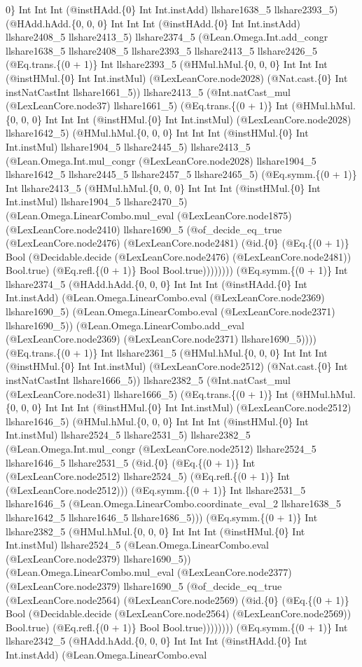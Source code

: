\documentclass[11pt]{article}
\begin{document}
0\} Int Int Int (@instHAdd.\{0\} Int Int.instAdd) llshare1638\_5 llshare2393\_5) (@HAdd.hAdd.\{0, 0, 0\} Int Int Int (@instHAdd.\{0\} Int Int.instAdd) llshare2408\_5 llshare2413\_5) llshare2374\_5 (@Lean.Omega.Int.add\_congr llshare1638\_5 llshare2408\_5 llshare2393\_5 llshare2413\_5 llshare2426\_5 (@Eq.trans.\{(0 + 1)\} Int llshare2393\_5 (@HMul.hMul.\{0, 0, 0\} Int Int Int (@instHMul.\{0\} Int Int.instMul) (@LexLeanCore.node2028) (@Nat.cast.\{0\} Int instNatCastInt llshare1661\_5)) llshare2413\_5 (@Int.natCast\_mul (@LexLeanCore.node37) llshare1661\_5) (@Eq.trans.\{(0 + 1)\} Int (@HMul.hMul.\{0, 0, 0\} Int Int Int (@instHMul.\{0\} Int Int.instMul) (@LexLeanCore.node2028) llshare1642\_5) (@HMul.hMul.\{0, 0, 0\} Int Int Int (@instHMul.\{0\} Int Int.instMul) llshare1904\_5 llshare2445\_5) llshare2413\_5 (@Lean.Omega.Int.mul\_congr (@LexLeanCore.node2028) llshare1904\_5 llshare1642\_5 llshare2445\_5 llshare2457\_5 llshare2465\_5) (@Eq.symm.\{(0 + 1)\} Int llshare2413\_5 (@HMul.hMul.\{0, 0, 0\} Int Int Int (@instHMul.\{0\} Int Int.instMul) llshare1904\_5 llshare2470\_5) (@Lean.Omega.LinearCombo.mul\_eval (@LexLeanCore.node1875) (@LexLeanCore.node2410) llshare1690\_5 (@of\_decide\_eq\_true (@LexLeanCore.node2476) (@LexLeanCore.node2481) (@id.\{0\} (@Eq.\{(0 + 1)\} Bool (@Decidable.decide (@LexLeanCore.node2476) (@LexLeanCore.node2481)) Bool.true) (@Eq.refl.\{(0 + 1)\} Bool Bool.true)))))))) (@Eq.symm.\{(0 + 1)\} Int llshare2374\_5 (@HAdd.hAdd.\{0, 0, 0\} Int Int Int (@instHAdd.\{0\} Int Int.instAdd) (@Lean.Omega.LinearCombo.eval (@LexLeanCore.node2369) llshare1690\_5) (@Lean.Omega.LinearCombo.eval (@LexLeanCore.node2371) llshare1690\_5)) (@Lean.Omega.LinearCombo.add\_eval (@LexLeanCore.node2369) (@LexLeanCore.node2371) llshare1690\_5)))) (@Eq.trans.\{(0 + 1)\} Int llshare2361\_5 (@HMul.hMul.\{0, 0, 0\} Int Int Int (@instHMul.\{0\} Int Int.instMul) (@LexLeanCore.node2512) (@Nat.cast.\{0\} Int instNatCastInt llshare1666\_5)) llshare2382\_5 (@Int.natCast\_mul (@LexLeanCore.node31) llshare1666\_5) (@Eq.trans.\{(0 + 1)\} Int (@HMul.hMul.\{0, 0, 0\} Int Int Int (@instHMul.\{0\} Int Int.instMul) (@LexLeanCore.node2512) llshare1646\_5) (@HMul.hMul.\{0, 0, 0\} Int Int Int (@instHMul.\{0\} Int Int.instMul) llshare2524\_5 llshare2531\_5) llshare2382\_5 (@Lean.Omega.Int.mul\_congr (@LexLeanCore.node2512) llshare2524\_5 llshare1646\_5 llshare2531\_5 (@id.\{0\} (@Eq.\{(0 + 1)\} Int (@LexLeanCore.node2512) llshare2524\_5) (@Eq.refl.\{(0 + 1)\} Int (@LexLeanCore.node2512))) (@Eq.symm.\{(0 + 1)\} Int llshare2531\_5 llshare1646\_5 (@Lean.Omega.LinearCombo.coordinate\_eval\_2 llshare1638\_5 llshare1642\_5 llshare1646\_5 llshare1686\_5))) (@Eq.symm.\{(0 + 1)\} Int llshare2382\_5 (@HMul.hMul.\{0, 0, 0\} Int Int Int (@instHMul.\{0\} Int Int.instMul) llshare2524\_5 (@Lean.Omega.LinearCombo.eval (@LexLeanCore.node2379) llshare1690\_5)) (@Lean.Omega.LinearCombo.mul\_eval (@LexLeanCore.node2377) (@LexLeanCore.node2379) llshare1690\_5 (@of\_decide\_eq\_true (@LexLeanCore.node2564) (@LexLeanCore.node2569) (@id.\{0\} (@Eq.\{(0 + 1)\} Bool (@Decidable.decide (@LexLeanCore.node2564) (@LexLeanCore.node2569)) Bool.true) (@Eq.refl.\{(0 + 1)\} Bool Bool.true)))))))) (@Eq.symm.\{(0 + 1)\} Int llshare2342\_5 (@HAdd.hAdd.\{0, 0, 0\} Int Int Int (@instHAdd.\{0\} Int Int.instAdd) (@Lean.Omega.LinearCombo.eval 
\end{document}
